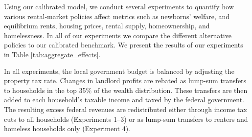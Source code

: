 \documentclass[parskip=full]{article}
\begin{document}
Using our calibrated model, we conduct several experiments to quantify how various rental-market policies affect metrics such as newborns' welfare, and equilibrium rents, housing prices, rental supply, homeownership, and homelessness. In all of our experiments we compare the different alternative policies to our calibrated benchmark. We present the results of our experiments in Table \ref{tab:aggregate_effects}.

In all experiments, the local government budget is balanced by adjusting the property tax rate. Changes in landlord profits are rebated as lump-sum transfers to households in the top 35\% of the wealth distribution. These transfers are then added to each household's taxable income and taxed by the federal government. The resulting excess federal revenues are redistributed either through income tax cuts to all households (Experiments 1–3) or as lump-sum transfers to renters and homeless households only (Experiment 4).
\end{document}
